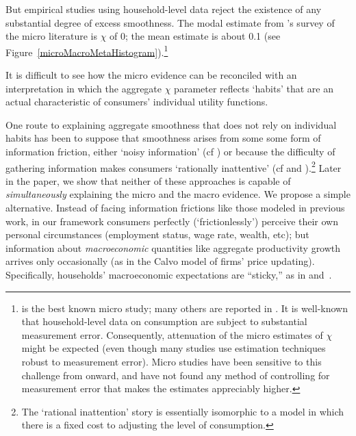\documentclass[titlepage]{\econtex}\newcommand{\texname}{cAndCwithStickyE}
\begin{document}
But empirical studies using household-level data reject the existence of any substantial degree of excess smoothness.  The modal estimate from \cite{hrsHabit}'s survey of the micro literature is $\chi$ of 0; the mean estimate is about 0.1 (see Figure~\ref{microMacroMetaHistogram}).\footnote{\cite{dynanHabits} is the best known micro study; many others are reported in \cite{hrsHabit}.  It is well-known that household-level data on consumption are subject to substantial measurement error. Consequently, attenuation of the micro estimates of $\chi$ might be expected (even though many studies use estimation techniques robust to measurement error). Micro studies have been sensitive to this challenge from \cite{dynanHabits} onward, and have not found any method of controlling for measurement error that makes the estimates appreciably higher.  } %

It is difficult to see how the micro evidence can be reconciled with an interpretation in which the aggregate $\chi$ parameter reflects `habits' that are an actual characteristic of consumers' individual utility functions.

One route to explaining aggregate smoothness that does not rely on individual habits has been to suppose that smoothness arises from some some form of information friction, either `noisy information' (cf \cite{pischkeMicroMacro}) or because the difficulty of gathering information makes consumers `rationally inattentive' (cf \cite{reis:inattentive} and \cite{mw09:RI}).\footnote{The `rational inattention' story is essentially isomorphic to a model in which there is a fixed cost to adjusting the level of consumption.}  Later in the paper, we show that neither of these approaches is capable of \textit{simultaneously} explaining the micro and the macro evidence.  We propose a simple alternative.  Instead of facing information frictions like those modeled in previous work, in our framework consumers perfectly (`frictionlessly') perceive their own personal circumstances (employment status, wage rate, wealth, etc); but information about \textit{macroeconomic} quantities like aggregate productivity growth arrives only occasionally (as in the Calvo model of firms' price updating).  Specifically, households' macroeconomic expectations are ``sticky,'' as in \cite{mrSlumps} and~\cite{carroll:epidemicinflQJE}.
\end{document}
